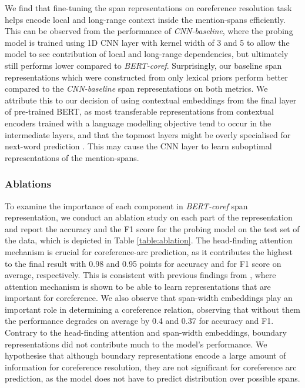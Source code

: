 \documentclass[11pt]{article}
\begin{document}
We find that fine-tuning the span representations on coreference resolution task helps encode local and long-range context inside the mention-spans efficiently. This can be observed from the performance of \textit{CNN-baseline}, where the probing model is trained using 1D CNN layer with kernel width of 3 and 5 to allow the model to see contribution of local and long-range dependencies, but ultimately still performs lower compared to \textit{BERT-coref}. Surprisingly, our baseline span representations which were constructed from only lexical priors perform better compared to the \textit{CNN-baseline} span representations on both metrics. We attribute this to our decision of using contextual embeddings from the final layer of pre-trained BERT, as most transferable representations from contextual encoders trained with a language modelling objective tend to occur in the intermediate layers, and that the topmost layers might be overly specialised for next-word prediction \parencite{liu2019linguistic,peters2018elmo,peters-etal-2018-dissecting,blevins-etal-2018-deep,devlin2019bert}. This may cause the CNN layer to learn suboptimal representations of the mention-spans.

\subsubsection{Ablations}
To examine the importance of each component in \textit{BERT-coref} span representation, we conduct an ablation study on each part of the representation and report the accuracy and the F1 score for the probing model on the test set of the data, which is depicted in Table \ref{table:ablation}. The head-finding attention mechanism is crucial for coreference-arc prediction, as it contributes the highest to the final result with 0.98 and 0.95 points for accuracy and for F1 score on average, respectively. This is consistent with previous findings from \textcite{lee2017end}, where attention mechanism is shown to be able to learn representations that are important for coreference. We also observe that span-width embeddings play an important role in determining a coreference relation, observing that without them the performance degrades on average by 0.4 and 0.37 for accuracy and F1. Contrary to the head-finding attention and span-width embeddings, boundary representations did not contribute much to the model's performance. We hypothesise that although boundary representations encode a large amount of information for coreference resolution, they are not significant for coreference arc prediction, as the model does not have to predict distribution over possible spans.
\end{document}
